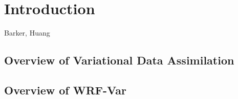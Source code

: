 \chapter{Introduction}
\label{intro}

Barker, Huang

\section{Overview of Variational Data Assimilation}
\label{overview}

\section{Overview of WRF-Var}
\label{overview-wrfvar}
